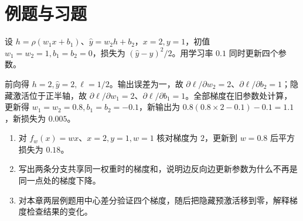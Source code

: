 \section{例题与习题}
\begin{example}[一次完整的两层更新]
设 $h=\rho(w_1x+b_1)$、$\widehat y=w_2h+b_2$，$x=2,y=1$，初值 $w_1=w_2=1,b_1=b_2=0$，损失为 $(\widehat y-y)^2/2$。用学习率 $0.1$ 同时更新四个参数。
\end{example}
\begin{solve}
前向得 $h=2,\widehat y=2,\ell=1/2$。输出误差为一，故 $\partial\ell/\partial w_2=2$、$\partial\ell/\partial b_2=1$；隐藏激活位于正半轴，故 $\partial\ell/\partial w_1=2$、$\partial\ell/\partial b_1=1$。全部梯度在旧参数处计算，更新得 $w_1=w_2=0.8,b_1=b_2=-0.1$，新输出为 $0.8(0.8\times2-0.1)-0.1=1.1$，新损失为 $0.005$。
\end{solve}
\begin{enumerate}
\item 对 $f_w(x)=wx$、$x=2,y=1,w=1$ 核对梯度为 $2$，更新到 $w=0.8$ 后平方损失为 $0.18$。
\item 写出两条分支共享同一权重时的梯度和，说明边反向边更新参数为什么不再是同一点处的梯度下降。
\item 对本章两层例题用中心差分验证四个梯度，随后把隐藏预激活移到零，解释梯度检查结果的变化。
\end{enumerate}

